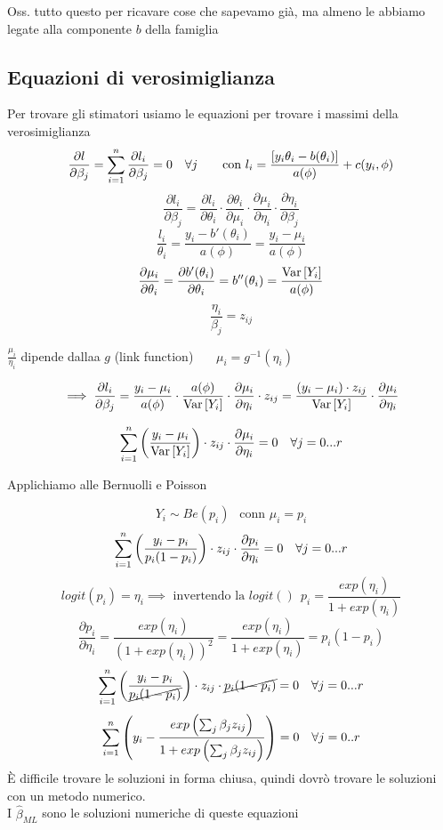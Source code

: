 \phantom{}

Oss. tutto questo per ricavare cose che sapevamo già, ma almeno le abbiamo legate alla componente $b$ della famiglia \\





\subsection{Equazioni di verosimiglianza}

Per trovare gli stimatori usiamo le equazioni per trovare i massimi della verosimiglianza
\[
\dfrac{\partial l}{\partial \beta_j} = \sum\limits_{i=1}^{n}\dfrac{\partial l_i}{\partial \beta_j}=0 \ \ \ \forall j \ \  \ \ \ \text{ con } l_i =  \dfrac{[y_i\theta_i - b(\theta_i)]}{a(\phi)} + c(y_i,\phi)
\]
\[
\frac{\partial l_i}{\partial \beta_j} = \frac{\partial l_i}{\partial \theta_i}\cdot \frac{\partial \theta_i}{\partial \mu_i} \cdot \frac{\partial \mu_i}{\partial \eta_i} \cdot \frac{\partial \eta_i}{\partial \beta_j}
\]
\[
\frac{l_i}{\theta_i} = \frac{y_i - b'(\theta_i)}{a(\phi)} = \frac{y_i-\mu_i}{a(\phi)}
\]
\[
\dfrac{\partial \mu_i}{\partial\theta_i} = \dfrac{\partial b'(\theta_i)}{\partial \theta_i} = b''(\theta_i) = \dfrac{\text{Var} \left[ Y_i \right]}{a(\phi)}
\]
\[
\frac{\eta_i}{\beta_j}=z_{ij}
\]

$\frac{\mu_i}{\eta_i}$ dipende dallaa $g$ (link function) \ \ \ $\mu_i=g^{-1}(\eta_i)$


\[
\implies \dfrac{\partial l_i}{\partial \beta_j} = \dfrac{y_i-\mu_i}{a(\phi)}\cdot \dfrac{a(\phi)}{\text{Var} \left[ Y_i \right]}\cdot\dfrac{\partial \mu_i}{\partial \eta_i}\cdot z_{ij} = \dfrac{(y_i-\mu_i)\cdot z_{ij}}{\text{Var} \left[ Y_i \right]}\cdot \dfrac{\partial \mu_i}{\partial \eta_i}\]

\[
\sum\limits_{i=1}^{n} \left(\dfrac{y_i-\mu_i}{\text{Var} \left[ Y_i \right]}\right)\cdot z_{ij} \cdot \dfrac{\partial \mu_i}{\partial \eta_i} =0 \ \ \ \forall j=0...r
\]
\phantom{}

Applichiamo alle Bernuolli e Poisson

\[
Y_i\sim Be(p_i) \ \  \text{ conn } \mu_i=p_i
\]
\[
\sum\limits_{i=1}^{n} \left(\dfrac{y_i-p_i}{p_i(1-p_i)}\right)\cdot z_{ij} \cdot \dfrac{\partial p_i}{\partial \eta_i} =0 \ \ \ \forall j=0...r
\]
\[
logit(p_i)=\eta_i \implies \text{ invertendo la } logit() \ \ p_i=\frac{exp(\eta_i)}{1+exp(\eta_i)}
\]
\[
\frac{\partial p_i}{\partial \eta_i} = \frac{exp(\eta_i)}{(1+exp(\eta_i))^2} = \frac{exp(\eta_i)}{1+exp(\eta_i)} = p_i(1-p_i)
\]
\[
\sum\limits_{i=1}^{n} \left(\dfrac{y_i-p_i}{\cancel{p_i(1-p_i)}}\right)\cdot z_{ij} \cdot \cancel{p_i(1-p_i)} =0 \ \ \ \forall j=0...r
\]
\[
\sum\limits_{i=1}^{n} \left( y_i - \dfrac{exp\left(\sum_j \beta_j z_{ij}\right)}{1+exp\left(\sum_j \beta_j z_{ij}\right)} \right) =0 \ \ \ \forall j=0..r
\]
È difficile trovare le soluzioni in forma chiusa, quindi dovrò trovare le soluzioni con un metodo numerico.\\
I $\hat{\beta}_{ML}$ sono le soluzioni numeriche di queste equazioni \\


